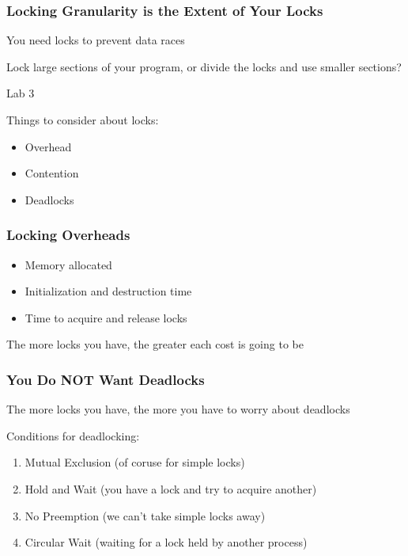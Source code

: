   \begin{frame}
    \frametitle{Locking Granularity is the Extent of Your Locks}

    You need locks to prevent data races

    \vspace{2em}

    Lock large sections of your program, or divide the locks and
    use smaller sections?

    \hspace{2em} Lab 3

    \vspace{2em}
    
    Things to consider about locks:

    \begin{itemize}
     \item Overhead
      \item Contention
      \item Deadlocks
    \end{itemize}
  \end{frame}

  \begin{frame}
    \frametitle{Locking Overheads}

    \begin{itemize}
      \item Memory allocated
      \item Initialization and destruction time
      \item Time to acquire and release locks
    \end{itemize}

    \vspace{2em}

    The more locks you have, the greater each cost is going to be
  \end{frame}

  \begin{frame}
    \frametitle{You Do NOT Want Deadlocks}

    The more locks you have, the more you have to worry about deadlocks

    \vspace{2em}

    Conditions for deadlocking:

    \begin{enumerate}
      \item Mutual Exclusion (of coruse for simple locks)
      \item Hold and Wait (you have a lock and try to acquire another)
      \item No Preemption (we can't take simple locks away)
      \item Circular Wait (waiting for a lock held by another process)
    \end{enumerate}
  \end{frame}

